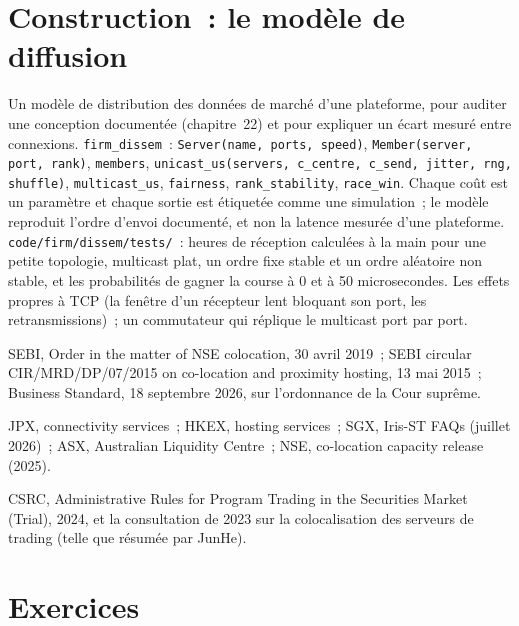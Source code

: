 \section{Construction~: le modèle de diffusion}\label{bld:nw:the-asia-pacific-map:dissem}

\begin{build}
 Un modèle de distribution des données de marché d'une plateforme, pour auditer une conception documentée (chapitre~22) et pour expliquer un écart mesuré
entre connexions.
 \texttt{firm\_dissem}~: \texttt{Server(name, ports, speed)}, \texttt{Member(server, port, rank)}, \texttt{members},
\texttt{unicast\_us(servers, c\_centre, c\_send, jitter, rng, shuffle)}, \texttt{multicast\_us}, \texttt{fairness}, \texttt{rank\_stability},
\texttt{race\_win}.
 Chaque coût est un paramètre et chaque sortie est étiquetée comme une simulation~; le modèle reproduit l'ordre d'envoi documenté, et non la
latence mesurée d'une plateforme.
 \texttt{code/firm/dissem/tests/}~: heures de réception calculées à la main pour une petite topologie, multicast plat, un ordre fixe stable
et un ordre aléatoire non stable, et les probabilités de gagner la course à 0 et à 50 microsecondes.
 Les effets propres à TCP (la fenêtre d'un récepteur lent bloquant son port, les retransmissions)~; un commutateur qui réplique le multicast
port par port.
\end{build}

\begin{omsources}
\item SEBI, Order in the matter of NSE colocation, 30 avril 2019~; SEBI circular CIR/MRD/DP/07/2015 on co-location and proximity hosting, 13 mai
2015~; Business Standard, 18 septembre 2026, sur l'ordonnance de la Cour suprême.
\item JPX, connectivity services~; HKEX, hosting services~; SGX, Iris-ST FAQs (juillet 2026)~; ASX, Australian Liquidity Centre~; NSE, co-location
capacity release (2025).
\item CSRC, Administrative Rules for Program Trading in the Securities Market (Trial), 2024, et la consultation de 2023 sur la colocalisation des serveurs de trading
(telle que résumée par JunHe).
\end{omsources}

\section{Exercices}

